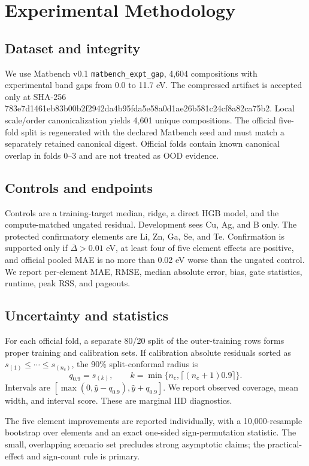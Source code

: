 \documentclass[11pt]{article}
\begin{document}
\section{Experimental Methodology}
\subsection{Dataset and integrity}
We use Matbench v0.1 \texttt{matbench\_expt\_gap}, 4,604 compositions with
experimental band gaps from 0.0 to 11.7 eV. The compressed artifact is accepted
only at SHA-256
{\footnotesize\ttfamily 783e7d1461eb83b00b2f2942da4b95fda5e58a0d1ae26b581c24cf8a82ca75b2}.
Local scale/order canonicalization yields 4,601 unique compositions. The
official five-fold split is regenerated with the declared Matbench seed and
must match a separately retained canonical digest. Official folds contain
known canonical overlap in folds 0--3 and are not treated as OOD evidence.

\subsection{Controls and endpoints}
Controls are a training-target median, ridge, a direct HGB model, and the
compute-matched ungated residual. Development sees Cu, Ag, and B only. The
protected confirmatory elements are Li, Zn, Ga, Se, and Te. Confirmation is
supported only if $\bar\Delta>0.01$ eV, at least four of five element effects
are positive, and official pooled MAE is no more than 0.02 eV worse than the
ungated control. We report per-element MAE, RMSE, median absolute error, bias,
gate statistics, runtime, peak RSS, and pageouts.

\subsection{Uncertainty and statistics}
For each official fold, a separate 80/20 split of the outer-training rows forms
proper training and calibration sets. If calibration absolute residuals sorted
as $s_{(1)}\le\cdots\le s_{(n_c)}$, the 90\% split-conformal radius is
\begin{equation}
 q_{0.9}=s_{(k)},\qquad k=\min\{n_c,\lceil(n_c+1)0.9\rceil\}.
\end{equation}
Intervals are $[\max(0,\hat y-q_{0.9}),\hat y+q_{0.9}]$. We report observed
coverage, mean width, and interval score. These are marginal IID diagnostics.

The five element improvements are reported individually, with a 10,000-resample
bootstrap over elements and an exact one-sided sign-permutation statistic. The
small, overlapping scenario set precludes strong asymptotic claims; the
practical-effect and sign-count rule is primary.
\end{document}
